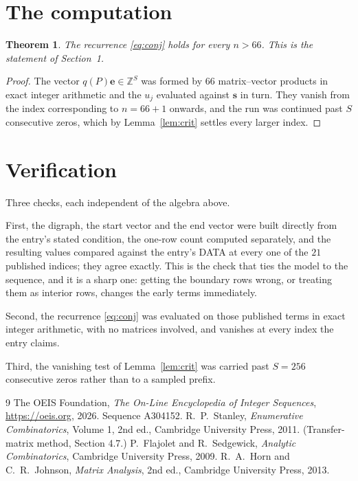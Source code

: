 \documentclass[11pt,a4paper]{article}
\theoremstyle{plain}
\newtheorem{theorem}{Theorem}
\theoremstyle{definition}
\begin{document}
\section{The computation}

\begin{theorem}
The recurrence \eqref{eq:conj} holds for every $n>66$. This is the statement of
Section~1.
\end{theorem}

\begin{proof}
The vector $q(P)\mathbf{e}\in\mathbb{Z}^{S}$ was formed by $66$ matrix--vector
products in exact integer arithmetic and the $u_j$ evaluated against $\mathbf{s}$ in turn.
They vanish from the index corresponding to $n=66+1$ onwards, and the run was continued
past $S$ consecutive zeros, which by Lemma~\ref{lem:crit} settles every larger index.
\end{proof}

\section{Verification}

Three checks, each independent of the algebra above.

First, the digraph, the start vector and the end vector were built directly from the
entry's stated condition, the one-row count computed separately, and the resulting values
compared against the entry's DATA at every one of the $21$ published indices; they
agree exactly. This is the check that ties the model to the sequence, and it is a sharp one:
getting the boundary rows wrong, or treating them as interior rows, changes the early terms
immediately.

Second, the recurrence \eqref{eq:conj} was evaluated on those published terms in exact
integer arithmetic, with no matrices involved, and vanishes at every index the entry claims.

Third, the vanishing test of Lemma~\ref{lem:crit} was carried past $S=256$ consecutive
zeros rather than to a sampled prefix.

\begin{thebibliography}{9}
 The OEIS Foundation, \emph{The On-Line Encyclopedia of Integer
Sequences}, \url{https://oeis.org}, 2026. Sequence A304152.
 R.~P.~Stanley, \emph{Enumerative Combinatorics}, Volume 1, 2nd ed.,
Cambridge University Press, 2011. (Transfer-matrix method, Section 4.7.)
 P.~Flajolet and R.~Sedgewick, \emph{Analytic Combinatorics}, Cambridge
University Press, 2009.
 R.~A.~Horn and C.~R.~Johnson, \emph{Matrix Analysis}, 2nd ed., Cambridge
University Press, 2013.
\end{thebibliography}
\end{document}
